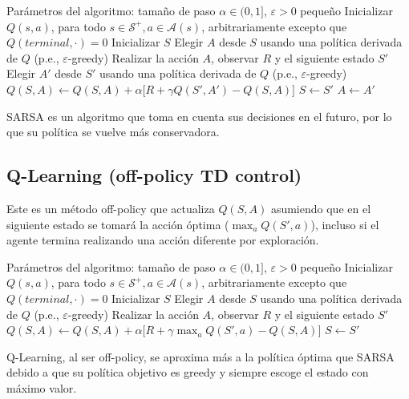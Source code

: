 \begin{algorithm}[h]
\caption{Sarsa: Control TD en la política (on-policy) para estimar $Q \approx q_*$}\label{algo:sarsa}
\begin{algorithmic}[1]
\Require Parámetros del algoritmo: tamaño de paso $\alpha \in (0, 1]$, $\varepsilon > 0$ pequeño
\State Inicializar $Q(s, a)$, para todo $s \in \mathcal{S}^+, a \in \mathcal{A}(s)$, arbitrariamente excepto que $Q(terminal, \cdot) = 0$
    \State Inicializar $S$
    \State Elegir $A$ desde $S$ usando una política derivada de $Q$ (p.e., $\varepsilon$-greedy)
        \State Realizar la acción $A$, observar $R$ y el siguiente estado $S'$
        \State Elegir $A'$ desde $S'$ usando una política derivada de $Q$ (p.e., $\varepsilon$-greedy)
        \State $Q(S, A) \gets Q(S, A) + \alpha \bigl[ R + \gamma Q(S', A') - Q(S, A) \bigr]$
        \State $S \gets S'$
        \State $A \gets A'$
    \EndWhile
\EndFor
\end{algorithmic}
\end{algorithm}
SARSA es un algoritmo que toma en cuenta sus decisiones en el futuro, por lo que su política se vuelve más conservadora.

\subsection*{Q-Learning (off-policy TD control)}
Este es un método off-policy que actualiza $Q(S, A)$ asumiendo que en el siguiente estado se tomará la acción óptima ($\max_a Q(S', a)$), incluso si el agente termina realizando una acción diferente por exploración.
\begin{algorithm}[!h]
\caption{Q-learning: Control TD fuera de la política (off-policy) para estimar $\pi \approx \pi_*$}\label{algo:q_learning_tabular}
\begin{algorithmic}[1]
\Require Parámetros del algoritmo: tamaño de paso $\alpha \in (0, 1]$, $\varepsilon > 0$ pequeño
\State Inicializar $Q(s, a)$, para todo $s \in \mathcal{S}^+, a \in \mathcal{A}(s)$, arbitrariamente excepto que $Q(terminal, \cdot) = 0$
    \State Inicializar $S$
    \Repeat {}
        \State Elegir $A$ desde $S$ usando una política derivada de $Q$ (p.e., $\varepsilon$-greedy)
        \State Realizar la acción $A$, observar $R$ y el siguiente estado $S'$
        \State $Q(S, A) \gets Q(S, A) + \alpha \bigl[ R + \gamma \max_a Q(S', a) - Q(S, A) \bigr]$
        \State $S \gets S'$
\EndFor
\end{algorithmic}
\end{algorithm}
Q-Learning, al ser off-policy, se aproxima más a la política óptima que SARSA debido a que su política objetivo es greedy y siempre escoge el estado con máximo valor.

